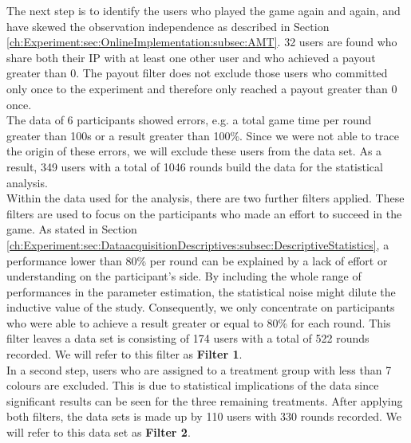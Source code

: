 The next step is to identify the users who played the game again and again, and have skewed the observation independence as described in Section \ref{ch:Experiment:sec:OnlineImplementation:subsec:AMT}. 32 users are found who share both their IP with at least one other user and who achieved a payout greater than 0. The payout filter does not exclude those users who committed only once to the experiment and therefore only reached a payout greater than 0 once. \\
The data of 6 participants showed errors, e.g. a total game time per round greater than 100s or a result greater than 100\%. Since we were not able to trace the origin of these errors, we will exclude these users from the data set.
As a result, 349 users with a total of 1046 rounds build the data for the statistical analysis.\\
Within the data used for the analysis, there are two further filters applied.
These filters are used to focus on the participants who made an effort to succeed in the game. As stated in Section \ref{ch:Experiment:sec:DataacquisitionDescriptives:subsec:DescriptiveStatistics}, a performance lower than 80\% per round can be explained by a lack of effort or understanding on the participant's side. By including the whole range of performances in the parameter estimation, the statistical noise might dilute the inductive value of the study. Consequently, we only concentrate on participants who were able to achieve a result greater or equal to 80\% for each round. This filter leaves a data set is consisting of 174 users with a total of 522 rounds recorded. We will refer to this filter as \textbf{Filter 1}.\\
In a second step, users who are assigned to a treatment group with less than 7 colours are excluded. This is due to statistical implications of the data since significant results can be seen for the three remaining treatments. After applying both filters, the data sets is made up by 110 users with 330 rounds recorded. We will refer to this data set as \textbf{Filter 2}.
%
%
%
%
%
%

